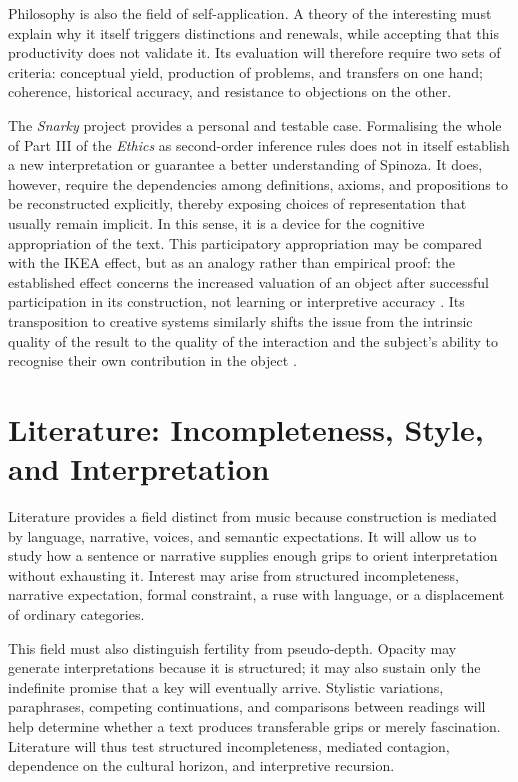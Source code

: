 \documentclass[11pt,a4paper]{article}
\begin{document}
Philosophy is also the field of self-application. A theory of the interesting
must explain why it itself triggers distinctions and renewals, while accepting
that this productivity does not validate it. Its evaluation will therefore
require two sets of criteria: conceptual yield, production of problems, and
transfers on one hand; coherence, historical accuracy, and resistance to
objections on the other.

The \emph{Snarky} project provides a personal and testable case. Formalising the
whole of Part III of the \emph{Ethics} as second-order inference rules does not
in itself establish a new interpretation or guarantee a better understanding of
Spinoza. It does, however, require the dependencies among definitions, axioms,
and propositions to be reconstructed explicitly, thereby exposing choices of
representation that usually remain implicit. In this sense, it is a device for
the cognitive appropriation of the text. This participatory appropriation may be
compared with the IKEA effect, but as an analogy rather than empirical proof:
the established effect concerns the increased valuation of an object after
successful participation in its construction, not learning or interpretive
accuracy \parencite{norton2012ikea}. Its transposition to creative systems
similarly shifts the issue from the intrinsic quality of the result to the
quality of the interaction and the subject's ability to recognise their own
contribution in the object \parencite[152--153]{pachet2026generation}.

\section{Literature: Incompleteness, Style, and Interpretation}

Literature provides a field distinct from music because construction is
mediated by language, narrative, voices, and semantic expectations. It will
allow us to study how a sentence or narrative supplies enough grips to orient
interpretation without exhausting it. Interest may arise from structured
incompleteness, narrative expectation, formal constraint, a ruse with language,
or a displacement of ordinary categories.

This field must also distinguish fertility from pseudo-depth. Opacity may
generate interpretations because it is structured; it may also sustain only the
indefinite promise that a key will eventually arrive. Stylistic variations,
paraphrases, competing continuations, and comparisons between readings will
help determine whether a text produces transferable grips or merely
fascination. Literature will thus test structured incompleteness, mediated
contagion, dependence on the cultural horizon, and interpretive recursion.
\end{document}
